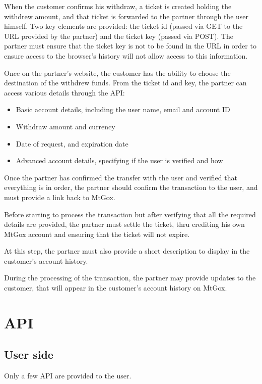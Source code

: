 \documentclass[a4paper,12pt]{article}
\begin{document}
When the customer confirms his withdraw, a ticket is created holding the
withdrew amount, and that ticket is forwarded to the partner through the user
himself. Two key elements are provided: the ticket id (passed via GET to the
URL provided by the partner) and the ticket key (passed via POST). The partner
must ensure that the ticket key is not to be found in the URL in order to
ensure access to the browser's history will not allow access to this
information.

Once on the partner's website, the customer has the ability to choose the
destination of the withdrew funds. From the ticket id and key, the partner
can access various details through the API:

\begin{itemize}
\item Basic account details, including the user name, email and account ID
\item Withdraw amount and currency
\item Date of request, and expiration date
\item Advanced account details, specifying if the user is verified and how
\end{itemize}

Once the partner has confirmed the transfer with the user and verified that
everything is in order, the partner should confirm the transaction to the
user, and must provide a link back to MtGox.

Before starting to process the transaction but after verifying that all the
required details are provided, the partner must settle the ticket, thru
crediting his own MtGox account and ensuring that the ticket will not expire.

At this step, the partner must also provide a short description to display
in the customer's account history.

During the processing of the transaction, the partner may provide updates
to the customer, that will appear in the customer's account history on
MtGox.

\section{API}

\subsection{User side}

Only a few API are provided to the user.
\end{document}
